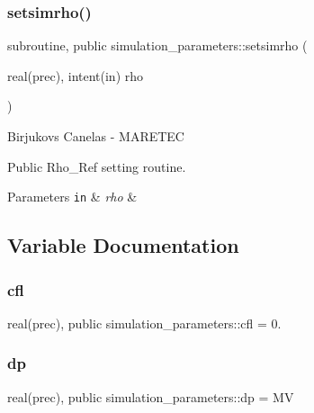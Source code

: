 \subsubsection{\texorpdfstring{setsimrho()}{setsimrho()}}
{\footnotesize\ttfamily subroutine, public simulation\+\_\+parameters\+::setsimrho (\begin{DoxyParamCaption}\item[{real(prec), intent(in)}]{rho }\end{DoxyParamCaption})}



Birjukovs Canelas -\/ M\+A\+R\+E\+T\+EC 

Public Rho\+\_\+\+Ref setting routine. 
\begin{DoxyParams}[1]{Parameters}
\mbox{\tt in}  & {\em rho} & \\
\hline
\end{DoxyParams}


\subsection{Variable Documentation}
\mbox{\label{namespacesimulation__parameters_a82ce5585265987eedbbaad0cd9cac673}} 
\subsubsection{\texorpdfstring{cfl}{cfl}}
{\footnotesize\ttfamily real(prec), public simulation\+\_\+parameters\+::cfl = 0.}

\mbox{\label{namespacesimulation__parameters_afe85a1735413a2cc7a220910f68bd214}} 
\subsubsection{\texorpdfstring{dp}{dp}}
{\footnotesize\ttfamily real(prec), public simulation\+\_\+parameters\+::dp = MV}

\mbox{\label{namespacesimulation__parameters_a5f4b25aae7394e93796760f8720af525}} 
